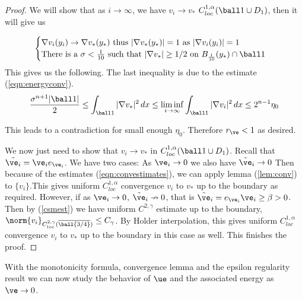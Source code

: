 \begin{proof}
            We will show that as $i \to \infty$, we have $v_i \to v_*$ $C^{1,\alpha}_{loc}(\ball 1 \cup D_1)$, then it will give us
            
            \begin{equation}\label{assump}
                \begin{cases}
                 \nabla v_i(y_i) \to \nabla v_*(y_*) \text{ thus } |\nabla v_*(y_*)|=1 \text{ as } |\nabla v_i(y_i)|=1  \\
               \text{There is a }\sigma<\frac{1}{10} \text{ such that }|\nabla v_*|  \geq 1/2 \text{ on }B_{\frac{1}{10}}(y_*)\cap \ball 1 
            \end{cases}
            \end{equation}
    This gives us the following. The last inequality is due to the estimate (\ref{eqn:energyconv}).
        \begin{equation}
            \frac{\sigma^{n+1}|\ball 1|}{2} \leq \int_{\ball 1}|\nabla v_*|^2\,dx \leq \liminf_{i\to \infty} \int_{\ball 1} |\nabla v_i|^2 \,dx \leq 2^{n-1} \eta_0
        \end{equation}    

This leads to a contradiction for small enough $\eta_0$. Therefore $r_\ve <1$ as desired. 



We now just need to show that $v_i \to v_*$ in $C^{1,\alpha}_{loc}(\ball 1 \cup D_1)$.  Recall that $\Tilde{\ve_i}=\ve_i e_{\ve_i}$. We have two cases: As $\ve_i \to 0$ we also have $\Tilde{\ve}_i \to 0$ Then because of the estimates (\ref{eqn:convestimates}), we can apply lemma (\ref{lem:conv}) to $\{v_i\}$.This gives uniform $C^{1,\alpha}_{loc}$ convergence $v_i$ to $v_*$ up to the boundary as required. However, if as $\ve_i \to 0$, $\Tilde{\ve}_i \nrightarrow 0$, that is $\Tilde{\ve}_i= e_{\ve_i} \ve_i \geq \beta >0$. Then by (\ref{csmest}) we have uniform $C^{2,\gamma}$ estimate up to the boundary, $\norm{v_i}_{C^{2,\gamma}_{loc}(\overline{\ball {3/4}}) } \leq C_{\gamma}$. By Holder interpolation, this gives uniform $C^{1,\alpha}_{loc}$ convergence $v_i$ to $v_*$ up to the boundary in this case as well. This finishes the proof.
\end{proof}

With the monotonicity formula, convergence lemma and the epsilon regularity result we can now study the behavior of $\ue$ and the associated energy as $\ve \to 0$. 